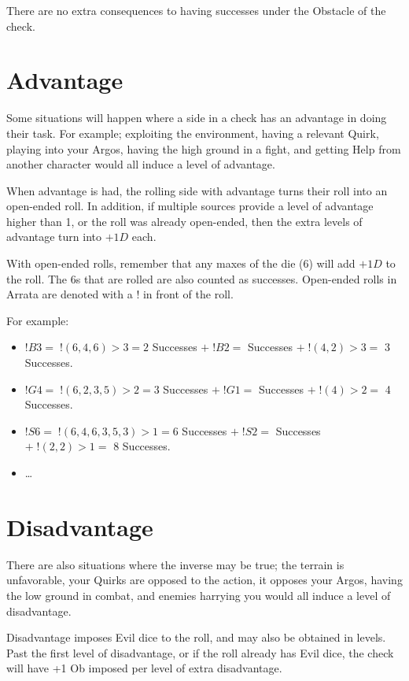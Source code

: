 \documentclass[../main.tex]{subfiles}
\begin{document}
    There are no extra consequences to having successes under the Obstacle of the check.
    
    \section{Advantage}

        Some situations will happen where a side in a check has an advantage in doing their task. For example; exploiting the environment, having a relevant Quirk, playing into your Argos, having the high ground in a fight, and getting Help from another character would all induce a level of advantage. 

        When advantage is had, the rolling side with advantage turns their roll into an open-ended roll. In addition, if multiple sources provide a level of advantage higher than 1, or the roll was already open-ended, then the extra levels of advantage turn into $+1D$ each.

        With open-ended rolls, remember that any maxes of the die (6) will add $+1D$ to the roll. The 6s that are rolled are also counted as successes. Open-ended rolls in Arrata are denoted with a $!$ in front of the roll.

        For example:

    \begin{itemize}
        \item $!B3 =\; !(6, 4, 6)>3 = 2$\; Successes $+\; !B2 = $ Successes $ +\; !(4, 2)>3 = $ 3 Successes.
        \item $!G4 =\; !(6, 2, 3, 5)>2 = 3$\; Successes $+\; !G1 = $ Successes $+\; !(4)>2 = $ 4 Successes.
        \item $!S6 =\; !(6, 4, 6, 3, 5, 3)>1 = 6$\; Successes $+\; !S2 = $ Successes $+\; !(2, 2)>1 = $ 8 Successes.
        \item \dots
    \end{itemize}

    \section{Disadvantage}

        There are also situations where the inverse may be true; the terrain is unfavorable, your Quirks are opposed to the action, it opposes your Argos, having the low ground in combat, and enemies harrying you would all induce a level of disadvantage.

        Disadvantage imposes Evil dice to the roll, and may also be obtained in levels. Past the first level of disadvantage, or if the roll already has Evil dice, the check will have +1 Ob imposed per level of extra disadvantage.
\end{document}
